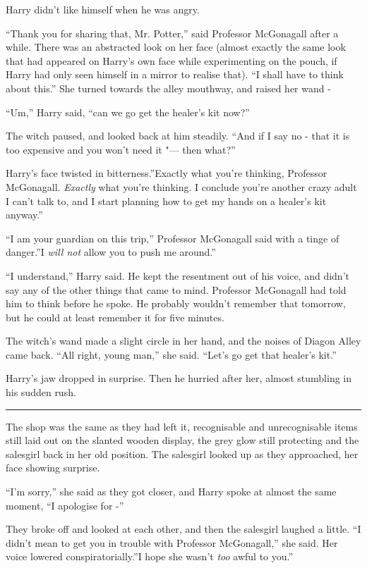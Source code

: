Harry didn't like himself when he was angry.

``Thank you for sharing that, Mr. Potter,'' said Professor McGonagall
after a while. There was an abstracted look on her face (almost exactly
the same look that had appeared on Harry's own face while experimenting
on the pouch, if Harry had only seen himself in a mirror to realise
that). ``I shall have to think about this.'' She turned towards the
alley mouthway, and raised her wand -

``Um,'' Harry said, ``can we go get the healer's kit now?''

The witch paused, and looked back at him steadily. ``And if I say no -
that it is too expensive and you won't need it "--- then what?''

Harry's face twisted in bitterness.''Exactly what you're thinking,
Professor McGonagall. \emph{Exactly} what you're thinking. I conclude
you're another crazy adult I can't talk to, and I start planning how to
get my hands on a healer's kit anyway.''

``I am your guardian on this trip,'' Professor McGonagall said with a
tinge of danger.''I \emph{will not} allow you to push me around.''

``I understand,'' Harry said. He kept the resentment out of his voice,
and didn't say any of the other things that came to mind. Professor
McGonagall had told him to think before he spoke. He probably wouldn't
remember that tomorrow, but he could at least remember it for five
minutes.

The witch's wand made a slight circle in her hand, and the noises of
Diagon Alley came back. ``All right, young man,'' she said. ``Let's go
get that healer's kit.''

Harry's jaw dropped in surprise. Then he hurried after her, almost
stumbling in his sudden rush.

\begin{center}\rule{3in}{0.4pt}\end{center}

The shop was the same as they had left it, recognisable and
unrecognisable items still laid out on the slanted wooden display, the
grey glow still protecting and the salesgirl back in her old position.
The salesgirl looked up as they approached, her face showing surprise.

``I'm sorry,'' she said as they got closer, and Harry spoke at almost
the same moment, ``I apologise for -''

They broke off and looked at each other, and then the salesgirl laughed
a little. ``I didn't mean to get you in trouble with Professor
McGonagall,'' she said. Her voice lowered conspiratorially.''I hope she
wasn't \emph{too} awful to you.''

